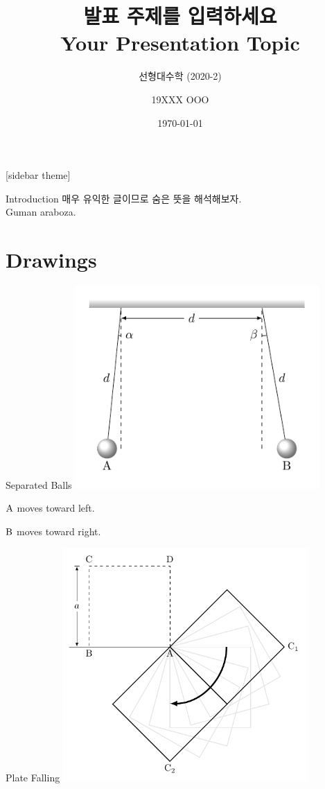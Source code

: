 \documentclass[12pt]{gshs_beamer_class}
\title[]{발표 주제를 입력하세요\\\small{Your Presentation Topic}}
\subtitle[]{선형대수학 (2020-2)}
\author[]{19XXX OOO}
\institute[]{과학영재학교 경기과학고등학교}
\date[]{\today}
\begin{document}
 \small

\begin{frame}[plain] %
	\titlepage
\end{frame}

[sidebar theme] %


\begin{frame}[t]{Introduction}
	매우 유익한 글이므로 숨은 뜻을 해석해보자.\\
	\lipsum[1] Guman araboza.
\end{frame}


\section{Drawings}
\begin{frame}[t]{Separated Balls}
	\centering
	\includegraphics[width=0.7\textwidth]{./figures/practice.pdf} \\
	
	\begin{minipage}{0.45\textwidth}
		\centering
		$\rm A$ moves toward left.
	\end{minipage}
	\begin{minipage}{0.45\textwidth}
		\centering
		$\rm B$ moves toward right.
	\end{minipage}
\end{frame}

\begin{frame}[t]{Plate Falling}
	\centering
	\includegraphics[width=0.7\textwidth]{./figures/plate.pdf}
\end{frame}
\end{document}
